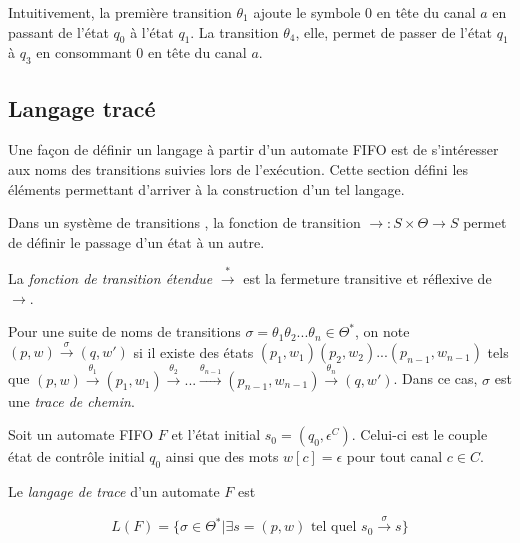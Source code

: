 \begin{example}
  Intuitivement, la première transition $\theta_1$ ajoute le symbole $0$ en tête du canal $a$ en passant de l'état $q_0$ à l'état $q_1$. La transition $\theta_4$, elle, permet de passer de l'état $q_1$ à $q_3$ en consommant $0$ en tête du canal $a$.

\end{example}



\subsection{Langage tracé}

Une façon de définir un langage à partir d'un automate FIFO est de s'intéresser aux noms des transitions suivies lors de l'exécution. Cette section défini les éléments permettant d'arriver à la construction d'un tel langage.

Dans un système de transitions \tsys, la fonction de transition $\rightarrow:S\times\Theta\rightarrow S$ permet de définir le passage d'un état à un autre.

La \emph{fonction de transition étendue} $\xrightarrow{*}$ est la fermeture transitive et réflexive de $\rightarrow$.

Pour une suite de noms de transitions $\sigma=\theta_1\theta_2 ...\theta_n\in\Theta^*$, on note $(p,w)\xrightarrow{\sigma}(q,w')$ si il existe des états $(p_1,w_1)(p_2,w_2)...(p_{n-1},w_{n-1})$ tels que $(p,w)\xrightarrow{\theta_1}(p_1,w_1)\xrightarrow{\theta_2}...\xrightarrow{\theta_{n-1}}(p_{n-1},w_{n-1})\xrightarrow{\theta_n}(q,w')$. Dans ce cas, $\sigma$ est une \emph{trace de chemin}.

\begin{definition} Soit un automate FIFO $F$ et l'état initial $s_0=(q_0, \epsilon^C)$. Celui-ci est le couple état de contrôle initial $q_0$ ainsi que des mots $w[c]=\epsilon$ pour tout canal $c\in C$.

  Le \emph{langage de trace} d'un automate $F$ est

  $$
  L(F)=\{\sigma\in\Theta^*|\exists s=(p,w) \text{ tel quel } s_0\xrightarrow{\sigma}s\}
  $$
\end{definition}

